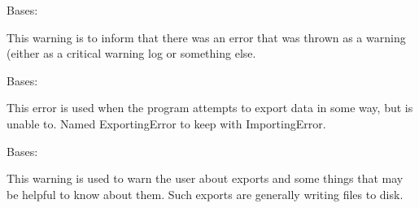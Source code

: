 \documentclass[letterpaper,10pt,english]{sphinxmanual}
\begin{document}

\begin{fulllineitems}
\label{\detokenize{docstrings/ifa_smeargle.core.error:ifa_smeargle.core.error.ErrorWarning}}
Bases: {\hyperref[\detokenize{docstrings/ifa_smeargle.core.error:ifa_smeargle.core.error.Ifas_Warning}]{}}

This warning is to inform that there was an error that was
thrown as a warning (either as a critical warning log or
something else.

\end{fulllineitems}


\begin{fulllineitems}
\label{\detokenize{docstrings/ifa_smeargle.core.error:ifa_smeargle.core.error.ExportingError}}
Bases: {\hyperref[\detokenize{docstrings/ifa_smeargle.core.error:ifa_smeargle.core.error.Ifas_Exception}]{}}

This error is used when the program attempts to export data in
some way, but is unable to. Named ExportingError to keep with
ImportingError.

\end{fulllineitems}


\begin{fulllineitems}
\label{\detokenize{docstrings/ifa_smeargle.core.error:ifa_smeargle.core.error.ExportingWarning}}
Bases: {\hyperref[\detokenize{docstrings/ifa_smeargle.core.error:ifa_smeargle.core.error.Ifas_Warning}]{}}

This warning is used to warn the user about exports and some
things that may be helpful to know about them. Such exports are
generally writing files to disk.

\end{fulllineitems}
\end{document}
